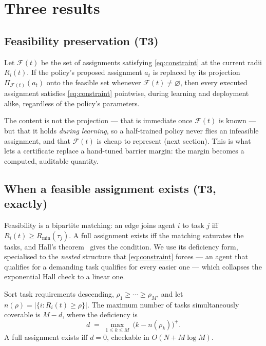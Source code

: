 \documentclass[11pt,a4paper]{article}
\newcommand{\Rmin}{R_{\min}}
\newcommand{\Ri}{R_i}
\begin{document}
\section{Three results}
\subsection{Feasibility preservation (T3)}
\begin{proposition}
\label{pr:feas}
Let $\mathcal F(t)$ be the set of assignments satisfying
\eqref{eq:constraint} at the current radii $\Ri(t)$. If the policy's proposed
assignment $a_t$ is replaced by its projection $\Pi_{\mathcal F(t)}(a_t)$ onto
the feasible set whenever $\mathcal F(t)\neq\varnothing$, then every executed
assignment satisfies
\eqref{eq:constraint} pointwise, during learning and deployment alike, regardless
of the policy's parameters.
\end{proposition}
\noindent
The content is not the projection --- that is immediate once $\mathcal F(t)$ is
known --- but that it holds \emph{during learning}, so a half-trained policy
never flies an infeasible assignment, and that $\mathcal F(t)$ is cheap to
represent (next section). This is what lets a certificate replace a hand-tuned
barrier margin: the margin becomes a computed, auditable quantity.

\subsection{When a feasible assignment exists (T3, exactly)}
Feasibility is a bipartite matching: an edge joins agent $i$ to task $j$ iff
$\Ri(t)\ge\Rmin(\tau_j)$. A full assignment exists iff the matching saturates the
tasks, and Hall's theorem~\cite{hall1935} gives the condition. We use its
deficiency form, specialised to the \emph{nested} structure that
\eqref{eq:constraint} forces --- an agent that qualifies for a demanding task
qualifies for every easier one --- which collapses the exponential Hall check to
a linear one.

\begin{proposition}
\label{pr:hall}
Sort task requirements descending, $\rho_1\ge\cdots\ge\rho_M$, and let
$n(\rho)=|\{i:\Ri(t)\ge\rho\}|$. The maximum number of tasks simultaneously
coverable is $M-d$, where the deficiency is
\[
d \;=\; \max_{1\le k\le M}\ \big(k-n(\rho_k)\big)^{+}.
\]
A full assignment exists iff $d=0$, checkable in $O(N+M\log M)$.
\end{proposition}
\end{document}
